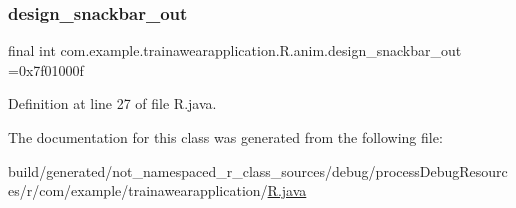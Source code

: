 \subsubsection{\texorpdfstring{design\_snackbar\_out}{design\_snackbar\_out}}
{\footnotesize\ttfamily final int com.\+example.\+trainawearapplication.\+R.\+anim.\+design\+\_\+snackbar\+\_\+out =0x7f01000f\hspace{0.3cm}{\ttfamily [static]}}



Definition at line 27 of file R.\+java.



The documentation for this class was generated from the following file\+:\begin{DoxyCompactItemize}
\item 
build/generated/not\+\_\+namespaced\+\_\+r\+\_\+class\+\_\+sources/debug/process\+Debug\+Resources/r/com/example/trainawearapplication/\mbox{\hyperlink{com_2example_2trainawearapplication_2_r_8java}{R.\+java}}\end{DoxyCompactItemize}
